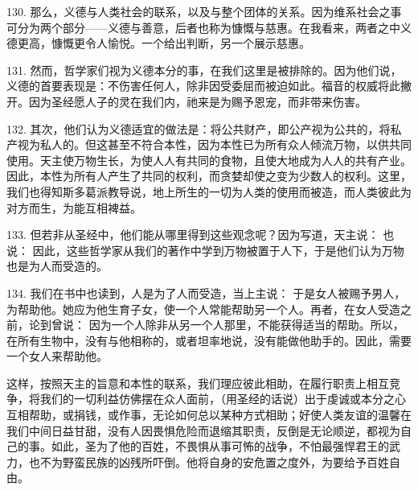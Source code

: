 130. 那么，义德与人类社会的联系，以及与整个团体的关系。因为维系社会之事可分为两个部分——义德与善意，后者也称为慷慨与慈惠。在我看来，两者之中义德更高，慷慨更令人愉悦。一个给出判断，另一个展示慈惠。\par

131. 然而，哲学家们视为义德本分的事，在我们这里是被排除的。因为他们说，义德的首要表现是：不伤害任何人，除非因受委屈而被迫如此。福音的权威将此撇开。因为圣经愿人子的灵在我们内，祂来是为赐予恩宠，而非带来伤害。\par

132. 其次，他们认为义德适宜的做法是：将公共财产，即公产视为公共的，将私产视为私人的。但这甚至不符合本性，因为本性已为所有众人倾流万物，以供共同使用。天主使万物生长，为使人人有共同的食物，且使大地成为人人的共有产业。因此，本性为所有人产生了共同的权利，而贪婪却使之变为少数人的权利。这里，我们也得知斯多葛派教导说，地上所生的一切为人类的使用而被造，而人类彼此为对方而生，为能互相裨益。\par

133. 但若非从圣经中，他们能从哪里得到这些观念呢？因为写道，天主说：  也说： 因此，这些哲学家从我们的著作中学到万物被置于人下，于是他们认为万物也是为人而受造的。\par

134. 我们在书中也读到，人是为了人而受造，当上主说：  于是女人被赐予男人，为帮助他。她应为他生育子女，使一个人常能帮助另一个人。再者，在女人受造之前，论到曾说：  因为一个人除非从另一个人那里，不能获得适当的帮助。所以，在所有生物中，没有与他相称的，或者坦率地说，没有能做他助手的。因此，需要一个女人来帮助他。\par

这样，按照天主的旨意和本性的联系，我们理应彼此相助，在履行职责上相互竞争，将我们的一切利益仿佛摆在众人面前，（用圣经的话说）出于虔诚或本分之心互相帮助，或捐钱，或作事，无论如何总以某种方式相助；好使人类友谊的温馨在我们中间日益甘甜，没有人因畏惧危险而退缩其职责，反倒是无论顺逆，都视为自己的事。如此，圣为了他的百姓，不畏惧从事可怖的战争，不怕最强悍君王的武力，也不为野蛮民族的凶残所吓倒。他将自身的安危置之度外，为要给予百姓自由。\par

